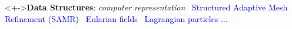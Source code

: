 \begin{frame}[fragile,label=ss-motivation]
\begin{block}<+->{\textbf{Data Structures}: \textit{computer representation}}
    \textcolor{blue}{
\footnotesize
    \textbullet\ Structured Adaptive Mesh Refinement (SAMR)
    \textbullet\ Eularian fields
    \textbullet\ Lagrangian particles
 \Large $\ldots$}
  
\end{block}

\end{frame}
